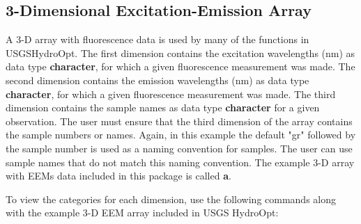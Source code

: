 \documentclass[a4paper,11pt]{article}\usepackage[]{graphicx}\usepackage[]{color}
\begin{document}
\subsection{3-Dimensional Excitation-Emission Array}
A 3-D array with fluorescence data is used by many of the functions in USGSHydroOpt. The first dimension contains the excitation wavelengths (nm) as data type \textbf{character}, for which a given fluorescence measurement was made. The second dimension contains the emission wavelengths (nm) as data type \textbf{character}, for which a given fluorescence measurement was made. The third dimension contains the sample names as data type \textbf{character} for a given observation. The user must ensure that the third dimension of the array contains the sample numbers or names. Again, in this example the default "gr" followed by the sample number is used as a naming convention for samples. The user can use sample names that do not match this naming convention. The example 3-D array with EEMs data included in this package is called \textbf{a}.

To view the categories for each dimension, use the following commands along with the example 3-D EEM array included in USGS HydroOpt:
\end{document}
